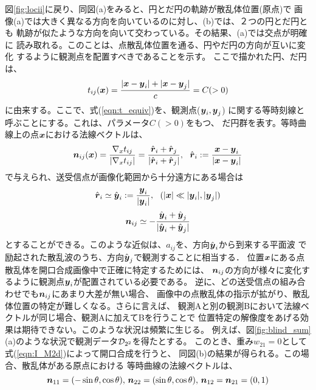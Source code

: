 \documentclass[10pt,a4j,dvipdfmx]{jarticle}
\begin{document}
図\ref{fig:locii}に戻り、同図(a)をみると、円とだ円の軌跡が散乱体位置(原点)で
画像(a)では大きく異なる方向を向いているのに対し、(b)では、２つの円とだ円とも
軌跡が似たような方向を向いて交わっている。その結果、(a)では交点が明確に
読み取れる。このことは、点散乱体位置を通る、円やだ円の方向が互いに変化
するように観測点を配置すべきであることを示す。
ここで描かれた円、だ円は、
\begin{equation}
	t_{ij}(\mbox{\boldmath $x$})=\frac{
		|\mbox{\boldmath $x$}-\mbox{\boldmath $y$}_i|
		+
		|\mbox{\boldmath $x$}-\mbox{\boldmath $y$}_j|
	}{c}
	=C (>0)
	\label{eqn:t_equiv}
\end{equation}
に由来する。ここで、式(\ref{eqn:t_equiv})を、観測点($\mbox{\boldmath $y$}_i,\mbox{\boldmath $y$}_j$)
に関する等時刻線と呼ぶことにする。これは、パラメータ$C(>0)$をもつ、
だ円群を表す。等時曲線上の点$\mbox{\boldmath $x$}$における法線ベクトルは、
\begin{equation}
	\fat{n}_{ij}(\fat{x}) =\frac{\nabla_x {t_{ij}}}{\left| \nabla_x t_{ij}\right|}
	=\frac{
		\hat{\fat{r}}_i+\hat{\fat{r}}_j
	}{
		\left| \hat{\fat{r}}_i+\hat{\fat{r}}_j \right|
	}
	, \ \ 
	\hat{\fat{r}}_i:=
	\frac{\fat{x}-\fat{y}_i}
	{\left| \fat{x} -\fat{y}_i\right|}
	\label{eqn:}
\end{equation}
で与えられ、送受信点が画像化範囲から十分遠方にある場合は
\begin{equation}
	\hat{\mbox{\boldmath $r$}}_i\simeq \hat{\mbox{\boldmath $y$}}_i:= \frac{\mbox{\boldmath $y$}_i}{|\mbox{\boldmath $y$}_i|}
	, \ \ (|\mbox{\boldmath $x$}|\ll |\mbox{\boldmath $y$}_i|,|\mbox{\boldmath $y$}_j|)
	\label{eqn:}
\end{equation}
\begin{equation}
	\mbox{\boldmath $n$}_{ij} \simeq  
	-\frac{\hat{\mbox{\boldmath $y$}}_i+\hat{\mbox{\boldmath $y$}}_j}
	{| \hat{\mbox{\boldmath $y$}}_i+\hat{\mbox{\boldmath $y$}}_j|}
	\label{eqn:}
\end{equation}
とすることができる。このような近似は、$a_{ij}$を、方向$\hat{\mbox{\boldmath $y$}}_i$から到来する平面波
で励起された散乱波のうち、方向$\hat{\mbox{\boldmath $y$}}_j$で観測することに相当する．
位置$\mbox{\boldmath $x$}$にある点散乱体を開口合成画像中で正確に特定するためには、
$\mbox{\boldmath $n$}_{ij}$の方向が様々に変化するように観測点$\mbox{\boldmath $y$}_i$が配置されている必要である。
逆に、どの送受信点の組み合わせでも$\mbox{\boldmath $n$}_{ij}$にあまり大差が無い場合、
画像中の点散乱体の指示が拡がり、散乱体位置の特定が難しくなる。さらに言えば、
観測Aと別の観測Bにおいて法線ベクトルが同じ場合、観測Aに加えてBを行うことで
位置特定の解像度をあげる効果は期待できない。このような状況は頻繁に生じる。
例えば、図\ref{fig:blind_sum}(a)のような状況で観測データ${\cal D}_{2^2}$を得たとする。
このとき、重み$w_{21}=0$として式(\ref{eqn:I_M2d})によって開口合成を行うと、
同図(b)の結果が得られる。この場合、散乱体がある原点における
等時曲線の法線ベクトルは、
\begin{equation}
	\mbox{\boldmath $n$}_{11}=(-\sin\theta,\cos\theta), \,
	\mbox{\boldmath $n$}_{22}=( \sin\theta,\cos\theta), \,
	\mbox{\boldmath $n$}_{12}=\mbox{\boldmath $n$}_{21}=(0,1)
	\label{eqn:}
\end{equation}
\end{document}
